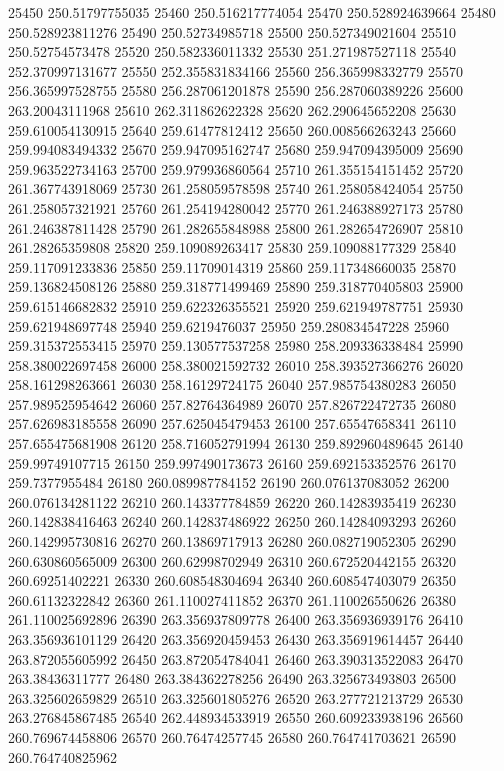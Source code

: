 {25450 250.51797755035
25460 250.516217774054
25470 250.528924639664
25480 250.528923811276
25490 250.52734985718
25500 250.527349021604
25510 250.52754573478
25520 250.582336011332
25530 251.271987527118
25540 252.370997131677
25550 252.355831834166
25560 256.365998332779
25570 256.365997528755
25580 256.287061201878
25590 256.287060389226
25600 263.20043111968
25610 262.311862622328
25620 262.290645652208
25630 259.610054130915
25640 259.61477812412
25650 260.008566263243
25660 259.994083494332
25670 259.947095162747
25680 259.947094395009
25690 259.963522734163
25700 259.979936860564
25710 261.355154151452
25720 261.367743918069
25730 261.258059578598
25740 261.258058424054
25750 261.258057321921
25760 261.254194280042
25770 261.246388927173
25780 261.246387811428
25790 261.282655848988
25800 261.282654726907
25810 261.28265359808
25820 259.109089263417
25830 259.109088177329
25840 259.117091233836
25850 259.11709014319
25860 259.117348660035
25870 259.136824508126
25880 259.318771499469
25890 259.318770405803
25900 259.615146682832
25910 259.622326355521
25920 259.621949787751
25930 259.621948697748
25940 259.6219476037
25950 259.280834547228
25960 259.315372553415
25970 259.130577537258
25980 258.209336338484
25990 258.380022697458
26000 258.380021592732
26010 258.393527366276
26020 258.161298263661
26030 258.16129724175
26040 257.985754380283
26050 257.989525954642
26060 257.82764364989
26070 257.826722472735
26080 257.626983185558
26090 257.625045479453
26100 257.65547658341
26110 257.655475681908
26120 258.716052791994
26130 259.892960489645
26140 259.99749107715
26150 259.997490173673
26160 259.692153352576
26170 259.7377955484
26180 260.089987784152
26190 260.076137083052
26200 260.076134281122
26210 260.143377784859
26220 260.14283935419
26230 260.142838416463
26240 260.142837486922
26250 260.14284093293
26260 260.142995730816
26270 260.13869717913
26280 260.082719052305
26290 260.630860565009
26300 260.62998702949
26310 260.672520442155
26320 260.69251402221
26330 260.608548304694
26340 260.608547403079
26350 260.61132322842
26360 261.110027411852
26370 261.110026550626
26380 261.110025692896
26390 263.356937809778
26400 263.356936939176
26410 263.356936101129
26420 263.356920459453
26430 263.356919614457
26440 263.872055605992
26450 263.872054784041
26460 263.390313522083
26470 263.38436311777
26480 263.384362278256
26490 263.325673493803
26500 263.325602659829
26510 263.325601805276
26520 263.277721213729
26530 263.276845867485
26540 262.448934533919
26550 260.609233938196
26560 260.769674458806
26570 260.76474257745
26580 260.764741703621
26590 260.764740825962
}
